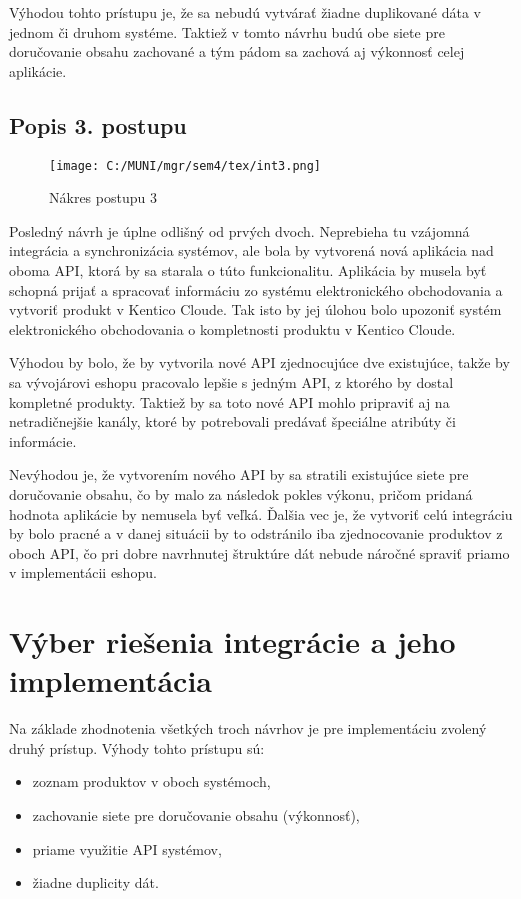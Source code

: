 \documentclass[
  printed, %
  table,   %
  lof,     %
  nolot,     %
  twoside,  
]{fithesis3}
\begin{document}
Výhodou tohto prístupu je, že sa nebudú vytvárať žiadne duplikované dáta v jednom či druhom systéme. Taktiež v tomto návrhu budú obe siete pre doručovanie obsahu zachované a tým pádom sa zachová aj výkonnosť celej aplikácie.


\subsection{Popis 3. postupu}
\begin{figure}[h]
  \begin{center}
        \texttt{[image: C:/MUNI/mgr/sem4/tex/int3.png]}
  \end{center}
  \caption{Nákres postupu 3}
  \label{fig:integration3}
\end{figure}
Posledný návrh je úplne odlišný od prvých dvoch. Neprebieha tu vzájomná integrácia a synchronizácia systémov, ale bola by vytvorená nová aplikácia nad oboma API, ktorá by sa starala o túto funkcionalitu. Aplikácia by musela byť schopná prijať a spracovať informáciu zo systému elektronického obchodovania a vytvoriť produkt v Kentico Cloude. Tak isto by jej úlohou bolo upozoniť systém elektronického obchodovania o kompletnosti produktu v Kentico Cloude.

Výhodou by bolo, že by vytvorila nové API zjednocujúce dve existujúce, takže by sa vývojárovi eshopu pracovalo lepšie s jedným API, z ktorého by dostal kompletné produkty. Taktiež by sa toto nové API mohlo pripraviť aj na netradičnejšie kanály, ktoré by potrebovali predávať špeciálne atribúty či informácie. 

Nevýhodou je, že vytvorením nového API by sa stratili existujúce siete pre doručovanie obsahu, čo by malo za následok pokles výkonu, pričom pridaná hodnota aplikácie by nemusela byť veľká. Ďalšia vec je, že vytvoriť celú integráciu by bolo pracné a v danej situácii by to odstránilo iba zjednocovanie produktov z oboch API, čo pri dobre navrhnutej štruktúre dát nebude náročné spraviť priamo v implementácii eshopu.

\section{Výber riešenia integrácie a jeho implementácia}
Na základe zhodnotenia všetkých troch návrhov je pre implementáciu zvolený druhý prístup. Výhody tohto prístupu sú: 
\begin{itemize}
	\item zoznam produktov v oboch systémoch,
	\item zachovanie siete pre doručovanie obsahu (výkonnosť),
	\item priame využitie API systémov,
	\item žiadne duplicity dát.
\end{itemize}
\end{document}
